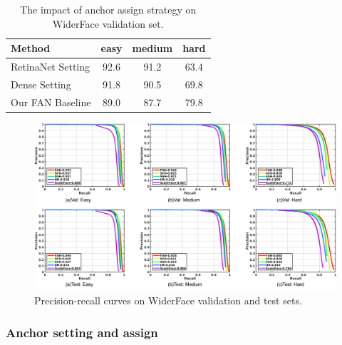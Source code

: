 \documentclass[10pt,twocolumn,letterpaper]{article}
\begin{document}

\begin{table}[h]
\begin{center}
\begin{tabular}{|l|c|c|c|}
\hline
Method & easy & medium & hard \\
\hline
RetinaNet Setting & 92.6 & 91.2 & 63.4 \\
Dense Setting & 91.8 & 90.5 & 69.8 \\
Our FAN Baseline & 89.0 & 87.7 & 79.8 \\
\hline
\end{tabular}
\end{center}
\caption{The impact of anchor assign strategy on WiderFace validation set.}
\label{table: anchor setting}
\end{table}

\begin{figure}[t]
\begin{center}
    \includegraphics[width=0.9\linewidth]{result.pdf}
\end{center}
    \caption{Precision-recall curves on WiderFace validation and test sets.} 
\label{fig:pr_curve}
\end{figure}

\subsubsection{Anchor setting and assign}
\end{document}
